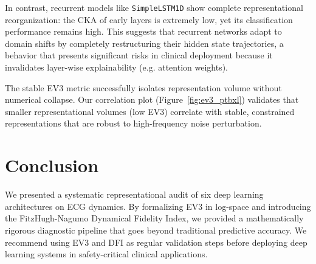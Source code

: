 \documentclass[twocolumn]{article}
\begin{document}
In contrast, recurrent models like \texttt{SimpleLSTM1D} show complete representational reorganization: the CKA of early layers is extremely low, yet its classification performance remains high. This suggests that recurrent networks adapt to domain shifts by completely restructuring their hidden state trajectories, a behavior that presents significant risks in clinical deployment because it invalidates layer-wise explainability (e.g. attention weights).

The stable EV3 metric successfully isolates representation volume without numerical collapse. Our correlation plot (Figure~\ref{fig:ev3_ptbxl}) validates that smaller representational volumes (low EV3) correlate with stable, constrained representations that are robust to high-frequency noise perturbation.

\section{Conclusion}
\label{sec:conclusion}
We presented a systematic representational audit of six deep learning architectures on ECG dynamics. By formalizing EV3 in log-space and introducing the FitzHugh-Nagumo Dynamical Fidelity Index, we provided a mathematically rigorous diagnostic pipeline that goes beyond traditional predictive accuracy. We recommend using EV3 and DFI as regular validation steps before deploying deep learning systems in safety-critical clinical applications.




\appendix

\end{document}
